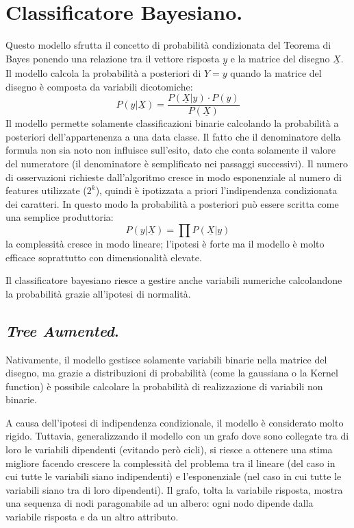 \documentclass[11pt, a4page, twocolumn]{article}
\begin{document}
\section{Classificatore Bayesiano.}
Questo modello sfrutta il concetto di probabilità condizionata del Teorema di Bayes ponendo una relazione tra il vettore risposta $\underline{y}$ e la matrice del disegno $\underline{X}$.
Il modello calcola la probabilità a posteriori di $Y = y$ quando la matrice del disegno è composta da variabili dicotomiche:
\begin{equation*}
  P(y | \underline{X}) = \frac{P(\underline{X} | y) \cdot P(y)}{P(\underline{X})}
\end{equation*}
Il modello permette solamente classificazioni binarie calcolando la probabilità a posteriori dell'appartenenza a una data classe.
Il fatto che il denominatore della formula non sia noto non influisce sull'esito, dato che conta solamente il valore del numeratore (il denominatore è semplificato nei passaggi successivi).
Il numero di osservazioni richieste dall'algoritmo cresce in modo esponenziale al numero di features utilizzate ($2^k$), quindi è ipotizzata a priori l'indipendenza condizionata dei caratteri.
In questo modo la probabilità a posteriori può essere scritta come una semplice produttoria:
\begin{equation*}
  P(y | \underline{X}) = \prod{}{}{P(\underline{X} | y)}
\end{equation*}
la complessità cresce in modo lineare; l'ipotesi è forte ma il modello è molto efficace soprattutto con dimensionalità elevate.

Il classificatore bayesiano riesce a gestire anche variabili numeriche calcolandone la probabilità grazie all'ipotesi di normalità.

\subsection*{\textit{Tree Aumented}.}
Nativamente, il modello gestisce solamente variabili binarie nella matrice del disegno, ma grazie a distribuzioni di probabilità (come la gaussiana o la Kernel function) è possibile calcolare la probabilità di realizzazione di variabili non binarie.

A causa dell'ipotesi di indipendenza condizionale, il modello è considerato molto rigido.
Tuttavia, generalizzando il modello con un grafo dove sono collegate tra di loro le variabili dipendenti (evitando però cicli), si riesce a ottenere una stima migliore facendo crescere la complessità del problema tra il lineare (del caso in cui tutte le variabili siano indipendenti) e l'esponenziale (nel caso in cui tutte le variabili siano tra di loro dipendenti).
Il grafo, tolta la variabile risposta, mostra una sequenza di nodi paragonabile ad un albero: ogni nodo dipende dalla variabile risposta e da un altro attributo.
\end{document}
